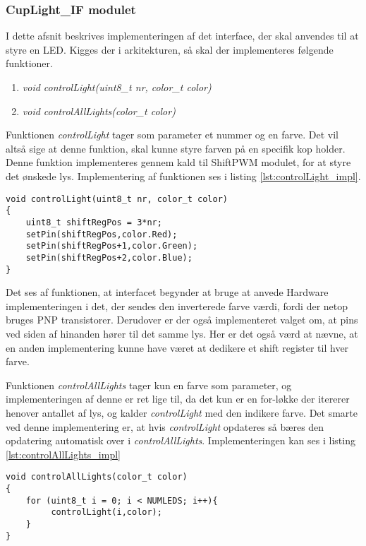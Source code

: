 \documentclass[Softwaredesign/Softwaredesign_main.tex]{subfiles}
\begin{document}
\subsubsection{CupLight\_IF modulet}
I dette afsnit beskrives implementeringen af det interface, der skal anvendes til at styre en LED. Kigges der i arkitekturen, så skal der implementeres følgende funktioner.
\begin{enumerate}
    \item \textit{void controlLight(uint8\_t nr, color\_t color)}
    \item \textit{void controlAllLights(color\_t color)}
\end{enumerate}

Funktionen \textit{controlLight} tager som parameter et nummer og en farve. Det vil altså sige at denne funktion, skal kunne styre farven på en specifik kop holder. Denne funktion implementeres gennem kald til ShiftPWM modulet, for at styre det ønskede lys. Implementering af funktionen ses i listing \ref{lst:controlLight_impl}.

\begin{lstlisting}[caption={Implementeringen af controlLight}, label={lst:controlLight_impl},
style=customc]
void controlLight(uint8_t nr, color_t color)
{
    uint8_t shiftRegPos = 3*nr;
    setPin(shiftRegPos,color.Red);
    setPin(shiftRegPos+1,color.Green);
    setPin(shiftRegPos+2,color.Blue);
}
\end{lstlisting}

Det ses af funktionen, at interfacet begynder at bruge at anvede Hardware implementeringen i det, der sendes den inverterede farve værdi, fordi der netop bruges PNP transistorer. Derudover er der også implementeret valget om, at pins ved siden af hinanden hører til det samme lys. Her er det også værd at nævne, at en anden implementering kunne have været at dedikere et shift register til hver farve.

Funktionen \textit{controlAllLights} tager kun en farve som parameter, og implementeringen af denne er ret lige til, da det kun er en for-løkke der itererer henover antallet af lys, og kalder \textit{controlLight} med den indikere farve. Det smarte ved denne implementering er, at hvis \textit{controlLight} opdateres så bæres den opdatering automatisk over i \textit{controlAllLights}.  Implementeringen kan ses i listing \ref{lst:controlAllLights_impl}

\begin{lstlisting}[caption={Implementeringen af controlAllLights}, label={lst:controlAllLights_impl},
style=customc]
void controlAllLights(color_t color)
{
    for (uint8_t i = 0; i < NUMLEDS; i++){
         controlLight(i,color);
    }
}
\end{lstlisting}
\end{document}
